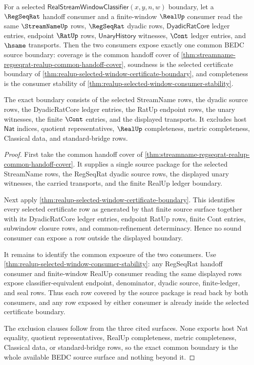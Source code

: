 \begin{theorem}
\label{thm:realup-selected-window-common-boundary-exactness}
For a selected $\mathsf{RealStreamWindowClassifier}(x,y,n,w)$ boundary, let a
$\RegSeqRat$ handoff consumer and a finite-window $\RealUp$ consumer read the
same $\StreamNameUp$ rows, $\RegSeqRat$ dyadic rows,
$\mathsf{DyadicRatCore}$ ledger entries, endpoint $\RatUp$ rows,
$\mathsf{UnaryHistory}$ witnesses, $\Cont$ ledger entries, and $\hsame$
transports. Then the two consumers expose exactly one common BEDC source
boundary: coverage is the common handoff cover of
\autoref{thm:streamname-regseqrat-realup-common-handoff-cover}, soundness is
the selected certificate boundary of
\autoref{thm:realup-selected-window-certificate-boundary}, and completeness
is the consumer stability of
\autoref{thm:realup-selected-window-consumer-stability}.

The exact boundary consists of the selected StreamName rows, the dyadic source
rows, the DyadicRatCore ledger entries, the RatUp endpoint rows, the unary
witnesses, the finite $\Cont$ entries, and the displayed transports. It
excludes host $\mathsf{Nat}$ indices, quotient representatives, $\RealUp$
completeness, metric completeness, Classical data, and standard-bridge rows.
\end{theorem}
\begin{proof}
First take the common handoff cover of
\autoref{thm:streamname-regseqrat-realup-common-handoff-cover}. It supplies a
single source package for the selected StreamName rows, the RegSeqRat dyadic
source rows, the displayed unary witnesses, the carried transports, and the
finite RealUp ledger boundary.

Next apply \autoref{thm:realup-selected-window-certificate-boundary}. This
identifies every selected certificate row as generated by that finite source
surface together with its DyadicRatCore ledger entries, endpoint RatUp rows,
finite Cont entries, subwindow closure rows, and common-refinement
determinacy. Hence no sound consumer can expose a row outside the displayed
boundary.

It remains to identify the common exposure of the two consumers. Use
\autoref{thm:realup-selected-window-consumer-stability}: any RegSeqRat
handoff consumer and finite-window RealUp consumer reading the same displayed
rows expose classifier-equivalent endpoint, denominator, dyadic source,
finite-ledger, and seal rows. Thus each row covered by the source package is
read back by both consumers, and any row exposed by either consumer is already
inside the selected certificate boundary.

The exclusion clauses follow from the three cited surfaces. None exports host
Nat equality, quotient representatives, RealUp completeness, metric
completeness, Classical data, or standard-bridge rows, so the exact common
boundary is the whole available BEDC source surface and nothing beyond it.
\end{proof}

